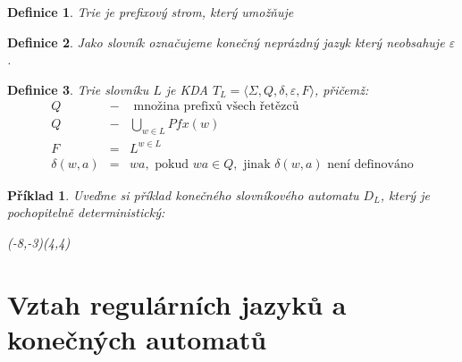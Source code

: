 \documentclass[10pt, a4paper, titlepage]{article}
\theoremstyle{note}
\newtheorem{definice}{\textbf{Definice}}
\newtheorem{priklad}{\textbf{Příklad}}
\begin{document}
\begin{definice}
\emph{Trie} je prefixový strom, který umožňuje 
\end{definice}

\begin{definice}
Jako \emph{slovník} označujeme konečný neprázdný jazyk který neobsahuje $\varepsilon$.
\end{definice}

\begin{definice}
Trie slovníku $L$ je KDA $T_{L} = \langle \Sigma, Q, \delta, \varepsilon, F \rangle$, přičemž:
\begin{eqnarray*}
Q &-& \text{ množina prefixů všech řetězců} \\
Q &-& \bigcup_{w \in L} Pfx(w) \\
F &=& L^{w \in L} \\
\delta(w,a) &=& wa, \text{ pokud } wa \in Q, \text{ jinak } \delta(w,a) \text{ není definováno}
\end{eqnarray*}
\end{definice}

\begin{priklad}
Uveďme si příklad konečného slovníkového automatu $D_{L}$, který je pochopitelně deterministický:



\begin{VCPicture}{(-8,-3)(4,4)}
\LargeState
{}



\end{VCPicture}

\end{priklad}


\section{Vztah regulárních jazyků a konečných automatů}
\end{document}
